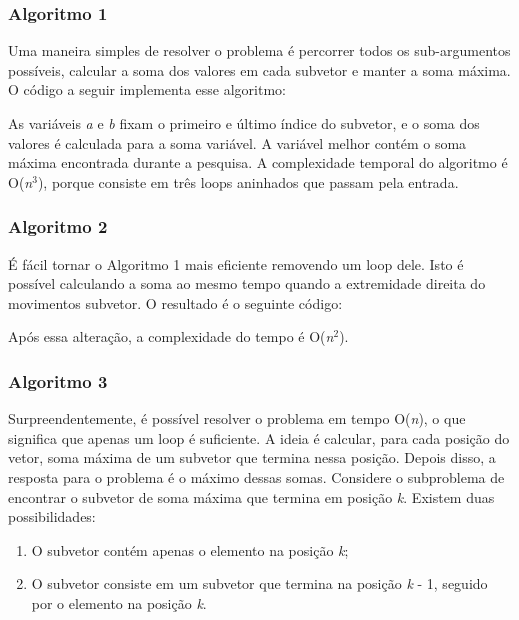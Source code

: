 \subsubsection{Algoritmo 1}

Uma maneira simples de resolver o problema é percorrer todos os sub-argumentos possíveis, calcular a soma dos valores em cada subvetor e manter a soma máxima. O código a seguir implementa esse algoritmo:



As variáveis \textit{a} e \textit{b} fixam o primeiro e último índice do subvetor, e o soma dos valores é calculada para a soma variável. A variável melhor contém o soma máxima encontrada durante a pesquisa. A complexidade temporal do algoritmo é O(\textit{n}$^3$), porque consiste em três loops aninhados que passam pela entrada.

\subsubsection{Algoritmo 2}

É fácil tornar o Algoritmo 1 mais eficiente removendo um loop dele. Isto é possível calculando a soma ao mesmo tempo quando a extremidade direita do movimentos subvetor. O resultado é o seguinte código:




Após essa alteração, a complexidade do tempo é O(\textit{n}$^2$).

\subsubsection{Algoritmo 3}

Surpreendentemente, é possível resolver o problema em tempo O(\textit{n}), o que significa que apenas um loop é suficiente. A ideia é calcular, para cada posição do vetor, soma máxima de um subvetor que termina nessa posição. Depois disso, a resposta para o problema é o máximo dessas somas. Considere o subproblema de encontrar o subvetor de soma máxima que termina em posição \textit{k}. Existem duas possibilidades:

    \begin{enumerate}
        \item O subvetor contém apenas o elemento na posição \textit{k};
        \item O subvetor consiste em um subvetor que termina na posição \textit{k} - 1, seguido por o elemento na posição \textit{k}.
    \end{enumerate}

